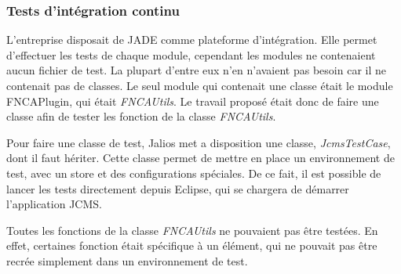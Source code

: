 \documentclass[12pt,a4paper]{article}
\begin{document}
\subsubsection{Tests d'intégration continu}
L'entreprise disposait de \gls{JADE} comme plateforme d'intégration. Elle permet d'effectuer les tests de chaque module, cependant les modules ne contenaient aucun fichier de test. La plupart d'entre eux n'en n'avaient pas besoin car il ne contenait pas de classes. Le seul module qui contenait une classe était le module FNCAPlugin, qui était \textit{FNCAUtils}. Le travail proposé était donc de faire une classe afin de tester les fonction de la classe \textit{FNCAUtils}.\par
Pour faire une classe de test, Jalios met a disposition une classe, \textit{JcmsTestCase}, dont il faut hériter. Cette classe permet de mettre en place un environnement de test, avec un store et des configurations spéciales. De ce fait, il est possible de lancer les tests directement depuis Eclipse, qui se chargera de démarrer l'application \gls{JCMS}.\par
Toutes les fonctions de la classe \textit{FNCAUtils} ne pouvaient pas être testées. En effet, certaines fonction était spécifique à un élément, qui ne pouvait pas être recrée simplement dans un environnement de test.\par 

\newpage
\end{document}

